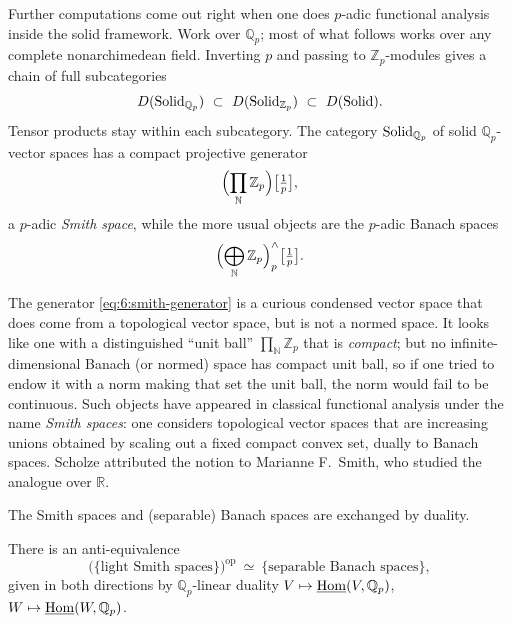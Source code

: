 Further computations come out right when one does $p$-adic functional analysis
inside the solid framework. Work over $\mathbb{Q}_p$; most of what follows works
over any complete nonarchimedean field. Inverting $p$ and passing to
$\mathbb{Z}_p$-modules gives a chain of full subcategories
\begin{equation*}
D(\Solid_{\mathbb{Q}_p})\ \subset\ D(\Solid_{\mathbb{Z}_p})\ \subset\ D(\Solid).
\end{equation*}
Tensor products stay within each subcategory. The category $\mathrm{Solid}_{\mathbb{Q}_p}$
of solid $\mathbb{Q}_p$-vector spaces has a compact projective generator
\begin{equation}
\label{eq:6:smith-generator}
\Bigl(\prod_{\mathbb{N}}\mathbb{Z}_p\Bigr)\bigl[\tfrac1p\bigr],
\end{equation}
a $p$-adic \emph{Smith space}, while the more usual objects are the $p$-adic
Banach spaces
\begin{equation*}
\Bigl(\bigoplus_{\mathbb{N}}\mathbb{Z}_p\Bigr)^{\wedge}_{p}\bigl[\tfrac1p\bigr].
\end{equation*}

\begin{remark}
\label{rmk:6:smith-not-normed}
The generator \eqref{eq:6:smith-generator} is a curious condensed vector space
that does come from a topological vector space, but is not a normed space. It
looks like one with a distinguished ``unit ball'' $\prod_{\mathbb{N}}\mathbb{Z}_p$
that is \emph{compact}; but no infinite-dimensional Banach (or normed) space has
compact unit ball, so if one tried to endow it with a norm making that set the
unit ball, the norm would fail to be continuous. Such objects have appeared in
classical functional analysis under the name \emph{Smith spaces}: one considers
topological vector spaces that are increasing unions obtained by scaling out a
fixed compact convex set, dually to Banach spaces. Scholze attributed the notion
to Marianne F.\ Smith, who studied the analogue over $\mathbb{R}$.
\end{remark}

The Smith spaces and (separable) Banach spaces are exchanged by duality.

\begin{proposition}
\label{prop:6:smith-banach}
There is an anti-equivalence
\begin{equation*}
\bigl(\{\text{light Smith spaces}\}\bigr)^{\mathrm{op}}\ \simeq\
\{\text{separable Banach spaces}\},
\end{equation*}
given in both directions by $\mathbb{Q}_p$-linear duality
$V\mapsto\underline{\operatorname{Hom}}(V,\mathbb{Q}_p)$, $W\mapsto\underline{\operatorname{Hom}}(W,\mathbb{Q}_p)$.
\end{proposition}

